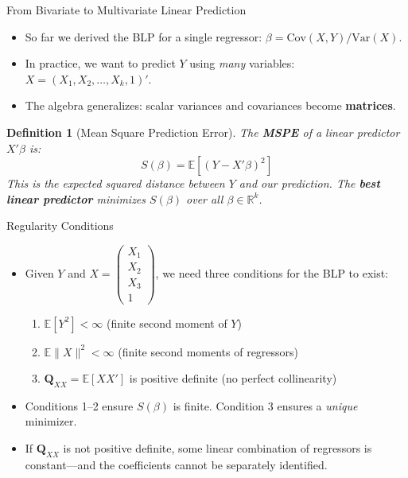 \documentclass[aspectratio=169, handout, t]{beamer}
\newtheorem{defn}{Definition}
\numberwithin{equation}{section}
\begin{document}
\begin{frame}{From Bivariate to Multivariate Linear Prediction}
\begin{itemize}
\item So far we derived the BLP for a single regressor: $\beta = \text{Cov}(X,Y)/\text{Var}(X)$.
\item In practice, we want to predict $Y$ using \emph{many} variables: $X = (X_1, X_2, \ldots, X_k, 1)'$.
\item The algebra generalizes: scalar variances and covariances become \textbf{matrices}.
\end{itemize}
\bigskip\pause
\begin{defn}[Mean Square Prediction Error]
The \textbf{MSPE} of a linear predictor $X'\beta$ is:
$$S(\beta) = \mathbb{E}\!\left[(Y - X'\beta)^2\right]$$
This is the expected squared distance between $Y$ and our prediction.  The \textbf{best linear predictor} minimizes $S(\beta)$ over all $\beta \in \mathbb{R}^k$.
\end{defn}
\end{frame}

\begin{frame}{Regularity Conditions}
\begin{itemize}
\item Given $Y$ and $X=\begin{pmatrix} X_1\\ X_2\\X_3\\1 \end{pmatrix}$, we need three conditions for the BLP to exist:
\begin{enumerate}
\item $\mathbb{E}[Y^2]<\infty$ \hfill (finite second moment of $Y$)
\item $\mathbb{E}\|X\|^2<\infty$ \hfill (finite second moments of regressors)
\item $\mathbf{Q}_{XX}=\mathbb{E}[XX']$ is positive definite \hfill (no perfect collinearity)
\end{enumerate}\pause
\bigskip
\item Conditions 1--2 ensure $S(\beta)$ is finite.  Condition 3 ensures a \emph{unique} minimizer.
\item If $\mathbf{Q}_{XX}$ is not positive definite, some linear combination of regressors is constant---and the coefficients cannot be separately identified.
\end{itemize}
\end{frame}
\end{document}
